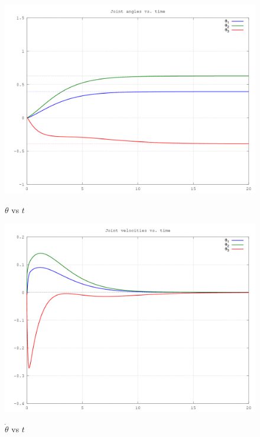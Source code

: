 \documentclass[10pt,a4paper]{article}
\begin{document}
\begin{figure}[H]
  \centering
  \includegraphics[angle = 0, scale = 0.3]{figures/Question1bJoints.png} 
  \label{fig:Q1bJoints}
  \caption{$\theta$ vs $t$}
\end{figure}

\begin{figure}[H]
  \centering
  \includegraphics[angle = 0, scale = 0.3]{figures/Question1bVels.png} 
  \label{fig:Q1bVels}
  \caption{$\dot{\theta}$ vs $t$}
\end{figure}
\end{document}
